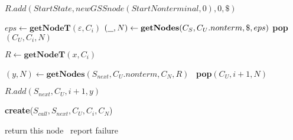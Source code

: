 \begin{algorithmic}
    \State $R.add(StartState, new GSSnode(StartNonterminal,0), 0, \$)$
    
    \State $eps \gets \textbf{getNodeT}(\varepsilon, C_{i})$  
    \State $(\underline{\hspace{0.25cm}}, N) \gets \textbf{getNodes}(C_{S},C_{U}.nonterm, \$, eps)$
    \State \textbf{pop}$(C_{U},C_{i},N)$ 
    \EndIf
    
            \State $R \gets \textbf{getNodeT}(x, C_{i})$
            
            \State $(y, N) \gets \textbf{getNodes}(S_{next},C_{U}.nonterm, C_{N}, R)$
                \ \textbf{pop}$(C_{U},i+1,N)$ 
            \EndIf
            
            \State $R.add(S_{next}, C_{U}, i + 1, y)$
            
        \EndCase
    
            \State \textbf{create}($S_{call}, S_{next}, C_{U}, C_{i}, C_{N}$)
        \EndCase
        \EndSwitch
        
    \EndFor
    \EndWhile
    \State return this node
    \Else
    \ report failure
    \EndIf
\EndFunction
\end{algorithmic}